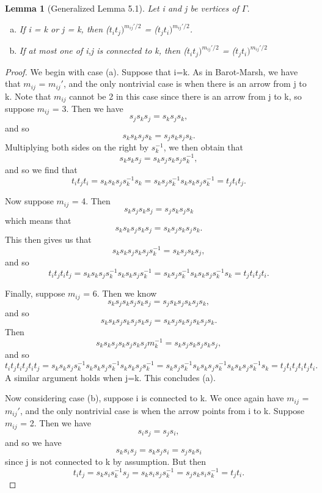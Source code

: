 \documentclass[11pt]{amsart}
\newtheorem{lem}[thm]{Lemma}
\theoremstyle{definition}
\begin{document}
\begin{lem}[Generalized Lemma 5.1]\label{lem:one_connected_to_k} Let i and j be vertices of $\Gamma$.
\begin{enumerate}[(a)]
\item If i = k or j = k, then ($t_{i}t_{j})^{m_{ij}'/2}$ = ($t_{j}t_{i})^{m_{ij}'/2}$.
\item If at most one of i,j is connected to k, then ($t_{i}t_{j})^{m_{ij}'/2}$ = ($t_{j}t_{i})^{m_{ij}'/2}$
\end{enumerate}
\end{lem}

\begin{proof}
We begin with case (a). Suppose that i=k. As in Barot-Marsh, we have that $m_{ij}$ = $m_{ij}'$, and the only nontrivial case is when there is an arrow from j to k. Note that $m_{ij}$ cannot be 2 in this case since there is an arrow from j to k, so suppose $m_{ij}$ = 3. Then we have $$s_{j}s_{k}s_{j} = s_{k}s_{j}s_{k},$$ and so $$s_{k}s_{k}s_{j}s_{k} = s_{j}s_{k}s_{j}s_{k}.$$ Multiplying both sides on the right by $s_{k}^{-1}$, we then obtain that $$s_{k}s_{k}s_{j} = s_{k}s_{j}s_{k}s_{j}s_{k}^{-1},$$ and so we find that $$t_{i}t_{j}t_{i} = s_{k}s_{k}s_{j}s_{k}^{-1}s_{k} = s_{k}s_{j}s_{k}^{-1}s_{k}s_{k}s_{j}s_{k}^{-1} = t_{j}t_{i}t_{j}.$$

Now suppose $m_{ij}$ = 4. Then $$s_{k}s_{j}s_{k}s_{j} = s_{j}s_{k}s_{j}s_{k}$$ which means that $$s_{k}s_{k}s_{j}s_{k}s_{j} = s_{k}s_{j}s_{k}s_{j}s_{k}.$$ This then gives us that $$s_{k}s_{k}s_{j}s_{k}s_{j}s_{k}^{-1} = s_{k}s_{j}s_{k}s_{j},$$ and so $$t_{i}t_{j}t_{i}t_{j} = s_{k}s_{k}s_{j}s_{k}^{-1}s_{k}s_{k}s_{j}s_{k}^{-1} = s_{k}s_{j}s_{k}^{-1}s_{k}s_{k}s_{j}s_{k}^{-1}s_{k} = t_{j}t_{i}t_{j}t_{i}.$$

Finally, suppose $m_{ij}$ = 6. Then we know $$s_{k}s_{j}s_{k}s_{j}s_{k}s_{j} = s_{j}s_{k}s_{j}s_{k}s_{j}s_{k},$$ and so $$s_{k}s_{k}s_{j}s_{k}s_{j}s_{k}s_{j} = s_{k}s_{j}s_{k}s_{j}s_{k}s_{j}s_{k}.$$ Then $$s_{k}s_{k}s_{j}s_{k}s_{j}s_{k}s_{j}m_{k}^{-1} = s_{k}s_{j}s_{k}s_{j}s_{k}s_{j},$$ and so $$t_{i}t_{j}t_{i}t_{j}t_{i}t_{j} = s_{k}s_{k}s_{j}s_{k}^{-1}s_{k}s_{k}s_{j}s_{k}^{-1}s_{k}s_{k}s_{j}s_{k}^{-1} = s_{k}s_{j}s_{k}^{-1}s_{k}s_{k}s_{j}s_{k}^{-1}s_{k}s_{k}s_{j}s_{k}^{-1}s_{k} = t_{j}t_{i}t_{j}t_{i}t_{j}t_{i}.$$ A similar argument holds when j=k. This concludes (a).

Now considering case (b), suppose i is connected to k. We once again have $m_{ij}$ = $m_{ij}'$, and the only nontrivial case is when the arrow points from i to k. Suppose $m_{ij}$ = 2. Then we have $$s_{i}s_{j} = s_{j}s_{i},$$ and so we have $$s_{k}s_{i}s_{j} = s_{k}s_{j}s_{i} = s_{j}s_{k}s_{i}$$ since j is not connected to k by assumption. But then $$t_{i}t_{j} = s_{k}s_{i}s_{k}^{-1}s_{j} = s_{k}s_{i}s_{j}s_{k}^{-1} = s_{j}s_{k}s_{i}s_{k}^{-1} = t_{j}t_{i}.$$


\end{proof}
\end{document}
